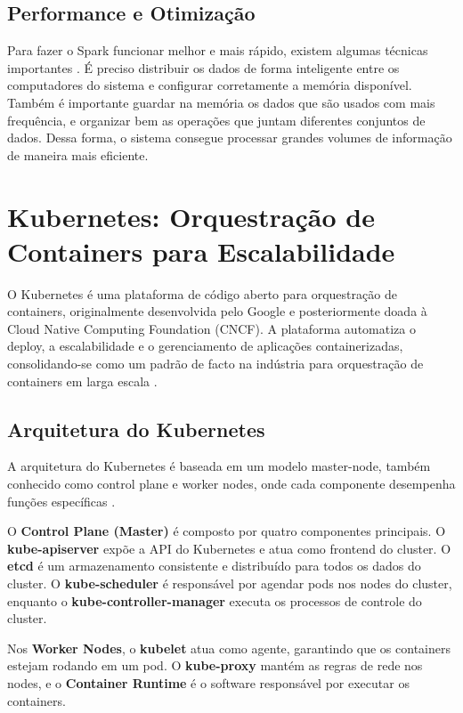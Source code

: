\subsection{Performance e Otimização}
Para fazer o Spark funcionar melhor e mais rápido, existem algumas técnicas importantes \cite{karau2023high}. É preciso 
distribuir os dados de forma inteligente entre os computadores do sistema e configurar corretamente a memória disponível. 
Também é importante guardar na memória os dados que são usados com mais frequência, e organizar bem as operações que juntam 
diferentes conjuntos de dados. Dessa forma, o sistema consegue processar grandes volumes de informação de maneira mais eficiente.

\section{Kubernetes: Orquestração de Containers para Escalabilidade}

O Kubernetes é uma plataforma de código aberto para orquestração de containers, originalmente desenvolvida pelo Google e posteriormente doada à Cloud Native Computing Foundation (CNCF). A plataforma automatiza o deploy, a escalabilidade e o gerenciamento de aplicações containerizadas, consolidando-se como um padrão de facto na indústria para orquestração de containers em larga escala \cite{burns2019kubernetes}.

\subsection{Arquitetura do Kubernetes}

A arquitetura do Kubernetes é baseada em um modelo master-node, também conhecido como control plane e worker nodes, onde cada componente desempenha funções específicas \cite{kubernetes_arch}.

O \textbf{Control Plane (Master)} é composto por quatro componentes principais. O \textbf{kube-apiserver} expõe a API do Kubernetes e atua como frontend do cluster. O \textbf{etcd} é um armazenamento consistente e distribuído para todos os dados do cluster. O \textbf{kube-scheduler} é responsável por agendar pods nos nodes do cluster, enquanto o \textbf{kube-controller-manager} executa os processos de controle do cluster.

Nos \textbf{Worker Nodes}, o \textbf{kubelet} atua como agente, garantindo que os containers estejam rodando em um pod. O \textbf{kube-proxy} mantém as regras de rede nos nodes, e o \textbf{Container Runtime} é o software responsável por executar os containers.

